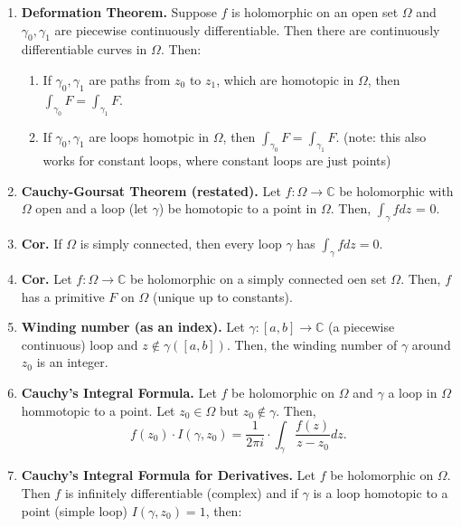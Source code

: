 \documentclass[12pt]{article}
\theoremstyle{definition}
\theoremstyle{named}
\begin{document}
{\begin{multicols}{2}
\begin{spacing}{1.01}
\begin{enumerate}
    \begin{enumerate}
        \item $f$ has a primitive $F$ on $D$. 
        \item if $\Gamma$ is any loop in $D$, then $\int_\Gamma = 0$. 
    \end{enumerate}
    \item \textbf{Deformation Theorem. } Suppose $f$ is holomorphic on an open set $\Omega$ and $\gamma_0, \gamma_1$ are piecewise continuously differentiable. Then there are continuously differentiable curves in $\Omega$. Then: 
    \begin{enumerate}
        \item If $\gamma_0, \gamma_1$ are paths from $z_0$ to $z_1$, which are homotopic in $\Omega$, then $\int_{\gamma_0} F = \int_{\gamma_1} F$. 
        \item If $\gamma_0, \gamma_1$ are loops homotpic in $\Omega$, then $\int_{\gamma_0} F = \int_{\gamma_1} F$. (note: this also works for constant loops, where constant loops are just points)
    \end{enumerate}
    \item \textbf{Cauchy-Goursat Theorem (restated). } Let $f: \Omega \to \mathbb{C}$ be holomorphic with $\Omega$ open and a loop (let $\gamma$) be homotopic to a point in $\Omega$. Then, $\int_{\gamma} f dz$ = 0. 
    \item \textbf{Cor. } If $\Omega$ is simply connected, then every loop $\gamma$ has $\int_\gamma f dz = 0$. 
    \item \textbf{Cor. } Let $f: \Omega \to \mathbb{C}$ be holomorphic on a simply connected oen set $\Omega$. Then, $f$ has a primitive $F$ on $\Omega$ (unique up to constants). 
    \item \textbf{Winding number (as an index). } Let $\gamma: [a,b] \to \mathbb{C}$ (a piecewise continuous) loop and $z \notin \gamma([a,b])$. Then, the winding number of $\gamma$ around $z_0$ is an integer. 
    \item \textbf{Cauchy's Integral Formula. } Let $f$ be holomorphic on $\Omega$ and $\gamma$ a loop in $\Omega$ hommotopic to a point. Let $z_0 \in \Omega$ but $z_0 \notin \gamma$. Then, 
    $$
    f(z_0) \cdot I(\gamma, z_0) = \frac{1}{2\pi i} \cdot \int_\gamma \frac{f(z)}{z-z_0} dz. 
    $$
    \item \textbf{Cauchy's Integral Formula for Derivatives. } Let $f$ be holomorphic on $\Omega$. Then $f$ is infinitely differentiable (complex) and if $\gamma$ is a loop homotopic to a point (simple loop) $I(\gamma, z_0) = 1$, then: 

\end{enumerate}
\end{spacing}
\end{multicols}}
\end{document}
